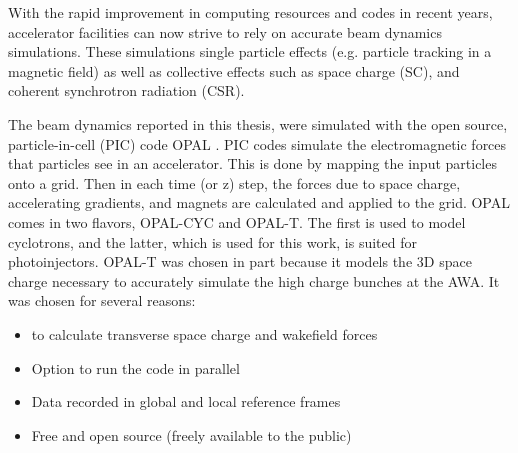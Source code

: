   \label{simulations}
\label{sec:code}


With the rapid improvement in computing resources and codes in recent years,  
accelerator facilities can now strive to rely on accurate beam dynamics simulations. 
These simulations  single particle effects 
(e.g. particle tracking in a magnetic field) as well as collective effects such as space charge (SC),  
and coherent synchrotron radiation (CSR).

The beam dynamics reported in this thesis, were simulated with 
the open source, particle-in-cell (PIC) code OPAL \cite{opal}. 
PIC codes simulate the electromagnetic forces that particles see in an accelerator. 
This is done by mapping the input particles onto a grid. 
Then in each time (or z) step, the forces due to space charge, accelerating gradients, 
and magnets are calculated and applied to the grid.
OPAL comes in two flavors, OPAL-CYC and OPAL-T. The first is used to model 
cyclotrons, and the latter, which is used for this work, is suited for photoinjectors. 
OPAL-T was chosen in part because it models the 3D space charge necessary to accurately simulate the high charge bunches at the AWA. 
It was chosen for several reasons:
\begin{itemize}
	\item {} to calculate transverse space charge and wakefield forces 
	\item Option to run the code in parallel
	\item Data recorded in global and local reference frames 
	\item Free and open source (freely available to the public)
\end{itemize} 

